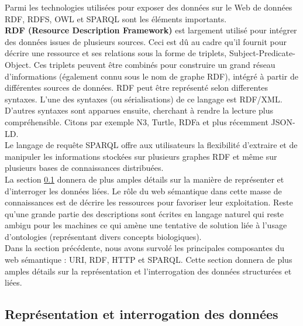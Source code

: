 
Parmi les technologies utilisées pour exposer des données sur le Web de données RDF, RDFS, OWL et SPARQL sont les éléments importants.\\

\textbf{RDF (Resource Description Framework)} est largement utilisé pour intégrer des données issues de plusieurs sources. Ceci est dû au cadre qu'il fournit pour décrire une ressource et ses relations sous la forme de triplets, Subject-Predicate-Object. Ces triplets peuvent être combinés pour construire un grand réseau d'informations (également connu sous le nom de graphe RDF), intégré à partir de différentes sources de données.  RDF peut être représenté selon differentes syntaxes. L'une des syntaxes (ou sérialisations) de ce langage est RDF/XML. D'autres syntaxes sont apparues ensuite, cherchant à rendre la lecture plus compréhensible. Citons par exemple N3, Turtle, RDFa et plus récemment JSON-LD.\\ 
 
Le langage de requête SPARQL offre aux utilisateurs la flexibilité d'extraire et de manipuler les informations stockées sur plusieurs graphes RDF et même sur plusieurs bases de connaissances distribuées. \\ 

La section \ref{interrogation} donnera de plus amples détails sur la manière de représenter et d’interroger les données liées.
Le rôle du web sémantique dans cette masse de connaissances est de décrire les ressources pour favoriser leur exploitation. Reste qu'une grande partie des descriptions sont écrites en langage naturel qui reste ambigu pour les machines ce qui amène une tentative de solution liée à l'usage d'ontologies (représentant divers concepts biologiques). \\

Dans la section précédente, nous avons survolé les principales composantes du web sémantique : URI, RDF, HTTP et SPARQL. Cette section donnera de plus amples détails sur la représentation et l’interrogation des données structurées et liées.

\subsection{Représentation et interrogation des données}\label{interrogation}

